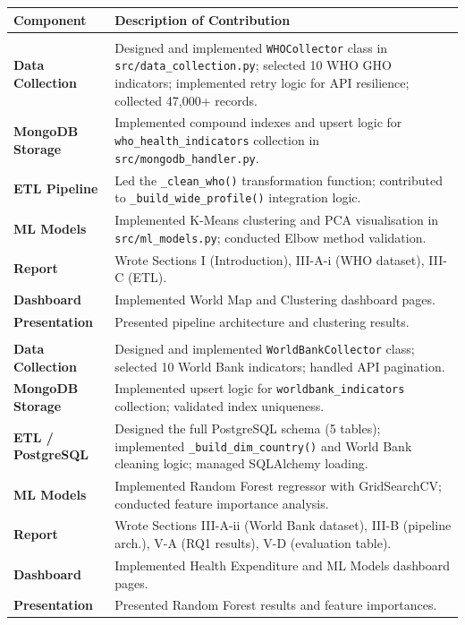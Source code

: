 \documentclass[12pt, a4paper]{article}
\begin{document}
\begin{tabular}{>{\bfseries}p{4cm} p{10cm}}
\toprule
Component & Description of Contribution \\
\midrule
\multicolumn{2}{l}{\textbf{Vecha Jatadhar}} \\
\midrule
Data Collection & Designed and implemented \texttt{WHOCollector} class in
  \texttt{src/data\_collection.py}; selected 10 WHO GHO indicators; implemented
  retry logic for API resilience; collected 47,000+ records. \\
MongoDB Storage & Implemented compound indexes and upsert logic for
  \texttt{who\_health\_indicators} collection in
  \texttt{src/mongodb\_handler.py}. \\
ETL Pipeline & Led the \texttt{\_clean\_who()} transformation function;
  contributed to \texttt{\_build\_wide\_profile()} integration logic. \\
ML Models & Implemented K-Means clustering and PCA visualisation in
  \texttt{src/ml\_models.py}; conducted Elbow method validation. \\
Report & Wrote Sections I (Introduction), III-A-i (WHO dataset), III-C (ETL). \\
Dashboard & Implemented World Map and Clustering dashboard pages. \\
Presentation & Presented pipeline architecture and clustering results. \\
\midrule
\multicolumn{2}{l}{\textbf{Pravalika Revelli (X25161261)}} \\
\midrule
Data Collection & Designed and implemented \texttt{WorldBankCollector} class;
  selected 10 World Bank indicators; handled API pagination. \\
MongoDB Storage & Implemented upsert logic for \texttt{worldbank\_indicators}
  collection; validated index uniqueness. \\
ETL / PostgreSQL & Designed the full PostgreSQL schema (5 tables); implemented
  \texttt{\_build\_dim\_country()} and World Bank cleaning logic;
  managed SQLAlchemy loading. \\
ML Models & Implemented Random Forest regressor with GridSearchCV;
  conducted feature importance analysis. \\
Report & Wrote Sections III-A-ii (World Bank dataset), III-B (pipeline arch.),
  V-A (RQ1 results), V-D (evaluation table). \\
Dashboard & Implemented Health Expenditure and ML Models dashboard pages. \\
Presentation & Presented Random Forest results and feature importances. \\

\end{tabular}
\end{document}
